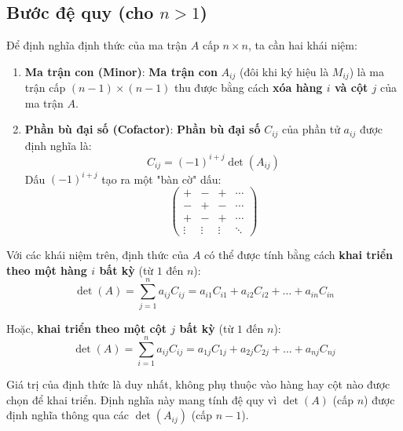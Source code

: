 \subsection*{Bước đệ quy (cho $n > 1$)}
Để định nghĩa định thức của ma trận $A$ cấp $n \times n$, ta cần hai khái niệm:

\begin{enumerate}
    \item \textbf{Ma trận con (Minor)}: \textbf{Ma trận con} $A_{ij}$ (đôi khi ký hiệu là $M_{ij}$) là ma trận cấp $(n-1) \times (n-1)$ thu được bằng cách \textbf{xóa hàng $i$ và cột $j$} của ma trận $A$.
    
    \item \textbf{Phần bù đại số (Cofactor)}: \textbf{Phần bù đại số} $C_{ij}$ của phần tử $a_{ij}$ được định nghĩa là:
    $$ C_{ij} = (-1)^{i+j} \det(A_{ij}) $$
    Dấu $(-1)^{i+j}$ tạo ra một "bàn cờ" dấu:
    $$ \begin{pmatrix}
    + & - & + & \cdots \\
    - & + & - & \cdots \\
    + & - & + & \cdots \\
    \vdots & \vdots & \vdots & \ddots
    \end{pmatrix} $$
\end{enumerate}

Với các khái niệm trên, định thức của $A$ có thể được tính bằng cách \textbf{khai triển theo một hàng $i$ bất kỳ} (từ $1$ đến $n$):
$$ \det(A) = \sum_{j=1}^{n} a_{ij} C_{ij} = a_{i1}C_{i1} + a_{i2}C_{i2} + \dots + a_{in}C_{in} $$

Hoặc, \textbf{khai triển theo một cột $j$ bất kỳ} (từ $1$ đến $n$):
$$ \det(A) = \sum_{i=1}^{n} a_{ij} C_{ij} = a_{1j}C_{1j} + a_{2j}C_{2j} + \dots + a_{nj}C_{nj} $$

Giá trị của định thức là duy nhất, không phụ thuộc vào hàng hay cột nào được chọn để khai triển. Định nghĩa này mang tính đệ quy vì $\det(A)$ (cấp $n$) được định nghĩa thông qua các $\det(A_{ij})$ (cấp $n-1$).



